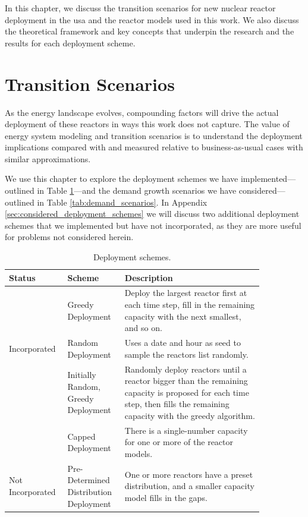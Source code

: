 In this chapter, we discuss the transition scenarios for new nuclear reactor deployment in the \gls{usa} and the reactor models used in this work. We also discuss the theoretical framework and key concepts that underpin the research and the results for each deployment scheme.

\section{Transition Scenarios}
\label{sec:transition_scenarios}

As the energy landscape evolves, compounding factors will drive the actual deployment of these reactors in ways this work does not capture. The value of energy system modeling and transition scenarios is to understand the deployment implications compared with and measured relative to business-as-usual cases with similar approximations.

We use this chapter to explore the deployment schemes we have
implemented---outlined in Table \ref{tab:deployment_schemes}---and the demand
growth scenarios we have considered---outlined in Table
\ref{tab:demand_scenarios}. In Appendix \ref{sec:considered_deployment_schemes}
we will discuss two additional deployment schemes that we implemented but
have not incorporated, as they are more useful for problems not considered herein.

\begin{table}[H]
    \centering
    \caption{Deployment schemes.}
    \label{tab:deployment_schemes}
    \begin{tabular}{p{0.15\linewidth} >{\raggedright}p{0.20\linewidth}>{\raggedright\arraybackslash}p{0.50\linewidth}}
        \hline
        Status & Scheme & Description \\
        \hline
         & Greedy Deployment & Deploy the largest
        reactor first at each time step, fill in the remaining capacity with
        the next smallest, and so on. \\
        Incorporated & Random Deployment & Uses a date and hour as seed to sample the
        reactors list randomly. \\
        & Initially Random, Greedy Deployment & Randomly deploy reactors until
        a reactor bigger than the remaining capacity is proposed for each time step,
        then fills the remaining capacity with the greedy algorithm. \\
        \hline
         & Capped Deployment & There is a
        single-number capacity for one or more of the reactor models. \\
        Not Incorporated & Pre-Determined Distribution Deployment & One or more reactors have a
        preset distribution, and a smaller capacity model fills in the gaps. \\
        \hline
    \end{tabular}
\end{table}

